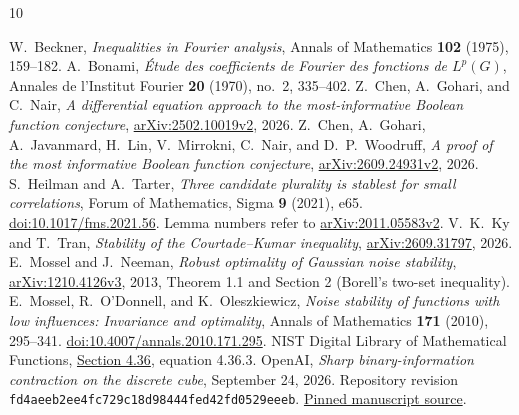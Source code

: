 \documentclass[11pt,reqno]{amsart}
\numberwithin{equation}{section}
\theoremstyle{definition}
\theoremstyle{remark}
\begin{document}
\begin{thebibliography}{10}
\raggedright
{} W.~Beckner, \emph{Inequalities in Fourier analysis},
Annals of Mathematics \textbf{102} (1975), 159--182.
 A.~Bonami, \emph{\'Etude des coefficients de Fourier des
fonctions de $L^p(G)$}, Annales de l'Institut Fourier \textbf{20}
(1970), no.~2, 335--402.
 Z.~Chen, A.~Gohari, and C.~Nair,
\emph{A differential equation approach to the most-informative Boolean
function conjecture},
\href{https://arxiv.org/abs/2502.10019v2}{arXiv:2502.10019v2}, 2026.
 Z.~Chen, A.~Gohari, A.~Javanmard, H.~Lin, V.~Mirrokni,
C.~Nair, and D.~P.~Woodruff,
\emph{A proof of the most informative Boolean function conjecture},
\href{https://arxiv.org/abs/2609.24931v2}{arXiv:2609.24931v2}, 2026.
 S.~Heilman and A.~Tarter,
\emph{Three candidate plurality is stablest for small correlations},
Forum of Mathematics, Sigma \textbf{9} (2021), e65.
\href{https://doi.org/10.1017/fms.2021.56}{doi:10.1017/fms.2021.56}.
Lemma numbers refer to
\href{https://arxiv.org/abs/2011.05583v2}{arXiv:2011.05583v2}.
 V.~K.~Ky and T.~Tran, \emph{Stability of the Courtade--Kumar inequality},
\href{https://arxiv.org/abs/2609.31797}{arXiv:2609.31797}, 2026.
 E.~Mossel and J.~Neeman,
\emph{Robust optimality of Gaussian noise stability},
\href{https://arxiv.org/abs/1210.4126v3}{arXiv:1210.4126v3}, 2013,
Theorem 1.1 and Section 2 (Borell's two-set inequality).
 E.~Mossel, R.~O'Donnell, and K.~Oleszkiewicz,
\emph{Noise stability of functions with low influences: Invariance and
optimality}, Annals of Mathematics \textbf{171} (2010), 295--341.
\href{https://doi.org/10.4007/annals.2010.171.295}{doi:10.4007/annals.2010.171.295}.
 NIST Digital Library of Mathematical Functions,
\href{https://dlmf.nist.gov/4.36}{Section 4.36}, equation 4.36.3.
 OpenAI,
\emph{Sharp binary-information contraction on the discrete cube},
September 24, 2026. Repository revision
\texttt{fd4aeeb2ee4fc729c18d98444fed42fd0529eeeb}.
\href{https://github.com/openai/math/tree/fd4aeeb2ee4fc729c18d98444fed42fd0529eeeb/preprints/Sharp-binary-information-contraction-on-the-discrete-cube-September-24-2026}{Pinned manuscript source}.
\end{thebibliography}
\end{document}
